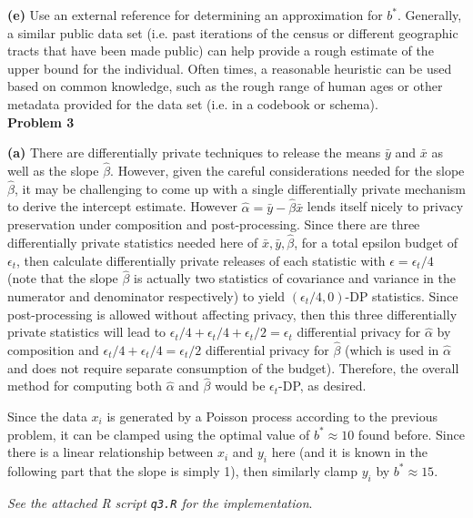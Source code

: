 \documentclass[12pt]{article}
\begin{document}
\textbf{(e)} Use an external reference for determining an approximation for $b^*$. Generally, a similar public data set (i.e. past iterations of the census or different geographic tracts that have been made public) can help provide a rough estimate of the upper bound for the individual. Often times, a reasonable heuristic can be used based on common knowledge, such as the rough range of human ages or other metadata provided for the data set (i.e. in a codebook or schema).\\

{\large\textbf{Problem 3}}

\textbf{(a)} There are differentially private techniques to release the means $\bar{y}$ and $\bar{x}$ as well as the slope $\hat{\beta}$. However, given the careful considerations needed for the slope $\hat{\beta}$, it may be challenging to come up with a single differentially private mechanism to derive the intercept estimate. However $\hat{\alpha} = \bar{y} - \hat{\beta}\bar{x}$ lends itself nicely to privacy preservation under composition and post-processing. Since there are three differentially private statistics needed here of $\bar{x}, \bar{y}, \hat{\beta}$, for a total epsilon budget of $\epsilon_t$, then calculate differentially private releases of each statistic with $\epsilon = \epsilon_t/4$ (note that the slope $\hat{\beta}$ is actually two statistics of covariance and variance in the numerator and denominator respectively) to yield $(\epsilon_t / 4,0)$-DP statistics. Since post-processing is allowed without affecting privacy, then this three differentially private statistics will lead to $\epsilon_t / 4 + \epsilon_t / 4 + \epsilon_t / 2 = \epsilon_t$ differential privacy for $\hat{\alpha}$ by composition and $\epsilon_t/4 + \epsilon_t/4 = \epsilon_t/2$ differential privacy for $\hat{\beta}$ (which is used in $\hat{\alpha}$ and does not require separate consumption of the budget). Therefore, the overall method for computing both $\hat{\alpha}$ and $\hat{\beta}$ would be $\epsilon_t$-DP, as desired.

Since the data $x_i$ is generated by a Poisson process according to the previous problem, it can be clamped using the optimal value of $b^*\approx 10$ found before. Since there is a linear relationship between $x_i$ and $y_i$ here (and it is known in the following part that the slope is simply 1), then similarly clamp $y_i$ by $b^* \approx 15$.

\emph{See the attached R script \texttt{q3.R} for the implementation}.\\
\end{document}
